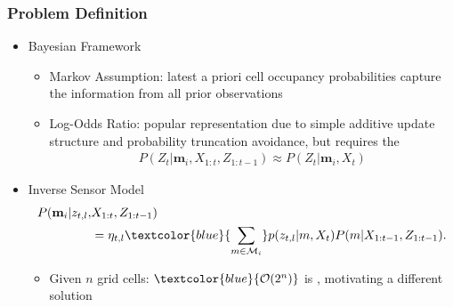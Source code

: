 \documentclass[11pt,professionalfonts,hyperref={pdftex,pdfpagemode=none,pdfstartview=FitH}]{beamer}
\renewcommand{\emph}[1]{\textit{\textbf{\color{blue}{#1}}}}
\begin{document}
\begin{frame}
\frametitle{Problem Definition}

\begin{itemize}
	\item Bayesian Framework
	\begin{itemize}
	\item Markov Assumption: latest a priori cell occupancy probabilities capture the information from all prior observations
	\item Log-Odds Ratio: popular representation due to simple additive update structure and probability truncation avoidance, but requires the \emph{assumption}
	\begin{align*}
		P(Z_t|\mathbf{m}_i,X_{1:t},Z_{1:t-1})\approx P(Z_t|\mathbf{m}_i,X_t)
	\end{align*}
	\end{itemize}
\vspace*{0.0cm}\pause
	\item Inverse Sensor Model
	\begin{align*}
P(\mathbf{m}_i|z_{t,l},&X_{1:t},Z_{1:t-1})\nonumber
\\
&=\eta_{t,l} \textcolor{blue}{\sum_{m\in\mathcal{M}_i}}p(z_{t,l}|m,X_{t})P(m|X_{1:t-1},Z_{1:t-1}).
\end{align*}
	\begin{itemize}
	\item Given $n$ grid cells: $\textcolor{blue}{\mathcal O(2^n)}$ is \emph{computationally intractable}, motivating a different solution
	\end{itemize}
\end{itemize}

\end{frame}
\end{document}
